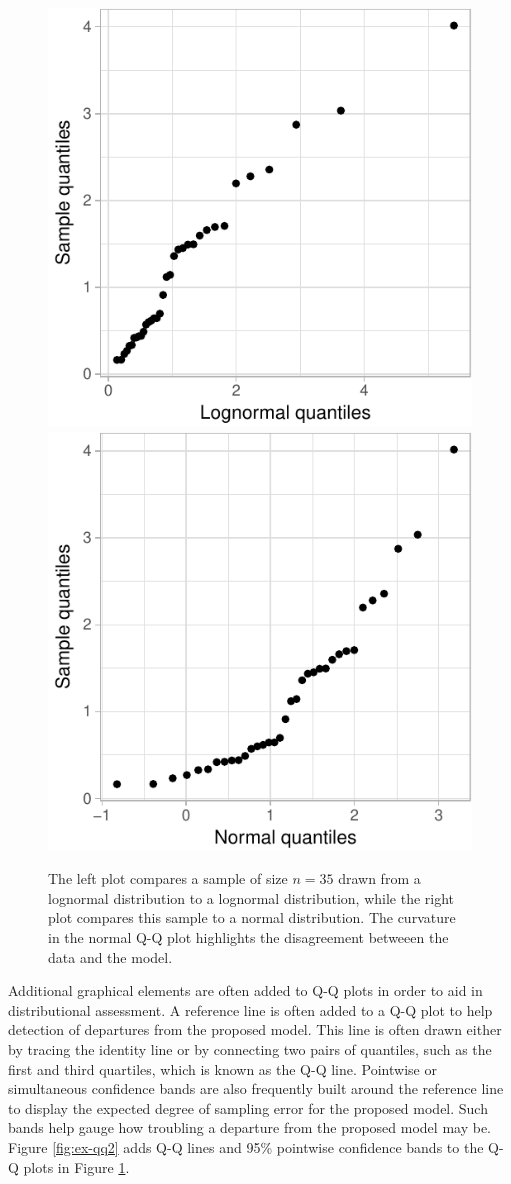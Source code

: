 \begin{Schunk}
\begin{figure}

{\centering \includegraphics[width=0.4\linewidth]{loy-figures/ex-qq1-1} \includegraphics[width=0.4\linewidth]{loy-figures/ex-qq1-2} 

}

\caption[The left plot compares a sample of size $n=35$ drawn from a lognormal distribution to a lognormal distribution, while the right plot compares this sample to a normal distribution]{The left plot compares a sample of size $n=35$ drawn from a lognormal distribution to a lognormal distribution, while the right plot compares this sample to a normal distribution. The curvature in the normal Q-Q plot highlights the disagreement betweeen the data and the model.}\label{fig:ex-qq1}
\end{figure}
\end{Schunk}

Additional graphical elements are often added to Q-Q plots in order to
aid in distributional assessment. A reference line is often added to a
Q-Q plot to help detection of departures from the proposed model. This
line is often drawn either by tracing the identity line or by connecting
two pairs of quantiles, such as the first and third quartiles, which is
known as the Q-Q line. Pointwise or simultaneous confidence bands are
also frequently built around the reference line to display the expected
degree of sampling error for the proposed model. Such bands help gauge
how troubling a departure from the proposed model may be. Figure
\ref{fig:ex-qq2} adds Q-Q lines and 95\% pointwise confidence bands to
the Q-Q plots in Figure \ref{fig:ex-qq1}.

